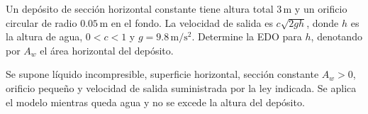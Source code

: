 Un depósito de sección horizontal constante tiene altura total $3\,\mathrm m$ y un orificio circular de radio $0.05\,\mathrm m$ en el fondo. La velocidad de salida es $c\sqrt{2gh}$, donde $h$ es la altura de agua, $0<c<1$ y $g=9.8\,\mathrm{m/s^2}$. Determine la EDO para $h$, denotando por $A_w$ el área horizontal del depósito.

Se supone líquido incompresible, superficie horizontal, sección constante $A_w>0$, orificio pequeño y velocidad de salida suministrada por la ley indicada. Se aplica el modelo mientras queda agua y no se excede la altura del depósito.

